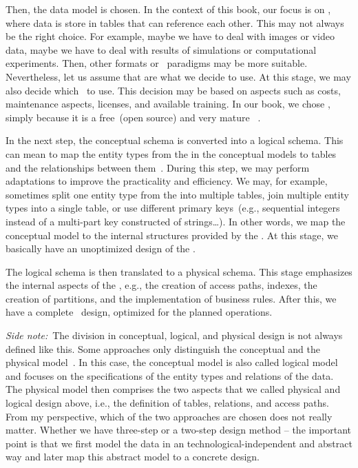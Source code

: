 Then, the data model is chosen.
In the context of this book, our focus is on , where data is store in tables that can reference each other.
This may not always be the right choice.
For example, maybe we have to deal with images or video data, maybe we have to deal with results of simulations or computational experiments.
Then, other formats or \db\ paradigms may be more suitable.
Nevertheless, let us assume that  are what we decide to use.
At this stage, we may also decide which \dbms\ to use.
This decision may be based on aspects such as costs, maintenance aspects, licenses, and available training.
In our book, we chose \postgresql, simply because it is a free~(open source) and very mature \sql\ \dbms.

In the next step, the conceptual schema is converted into a logical schema.
This can mean to map the entity types from the  in the conceptual models to tables and the relationships between them~\cite{SS2005EIDDDFDB:I,SS2005EIDDDFDB:CDDRAAML}.
During this step, we may perform adaptations to improve the practicality and efficiency.
We may, for example, sometimes split one entity type from the  into multiple tables, join multiple entity types into a single table, or use different primary keys~(e.g., sequential integers instead of a multi-part key constructed of strings\dots).
In other words, we map the conceptual model to the internal structures provided by the \dbms.
At this stage, we basically have an unoptimized design of the \db.

The logical schema is then translated to a physical schema.
This stage emphasizes the internal aspects of the \db, e.g., the creation of access paths, indexes, the creation of partitions, and the implementation of business rules.
After this, we have a complete \db\ design, optimized for the planned operations.

\emph{Side note:}~The division in conceptual, logical, and physical design is not always defined like this.
Some approaches only distinguish the conceptual and the physical model~\cite{G2011EW2ITDS:ITRD,V1999C5DMS:CI}.
In this case, the conceptual model is also called logical model and focuses on the specifications of the entity types and relations of the data.
The physical model then comprises the two aspects that we called physical and logical design above, i.e., the definition of tables, relations, and access paths.
From my perspective, which of the two approaches are chosen does not really matter.
Whether we have three-step or a two-step design method -- the important point is that we first model the data in an technological-independent and abstract way and later map this abstract model to a concrete design.

